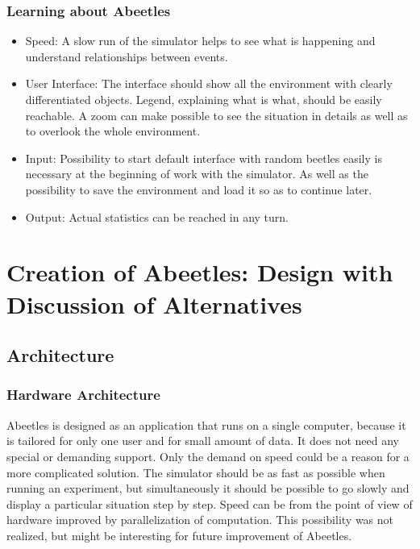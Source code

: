 \documentclass[a4paper,12pt]{report}
\begin{document}
\subsection{Learning about Abeetles}
\begin{itemize}
\item Speed: A slow run of the simulator helps to see what is happening and understand relationships between events.
\item User Interface: The interface should show all the environment with clearly differentiated objects. Legend, explaining what is what, should be easily reachable. A zoom can make possible to see the situation in details as well as to overlook the whole environment.
\item Input: Possibility to start default interface with random beetles easily is necessary at the beginning of work with the simulator. As well as the possibility to save the environment and load it so as to continue later.
\item Output: Actual statistics can be reached in any turn.  
\end{itemize}


\chapter{Creation of Abeetles: Design with Discussion of Alternatives}
\section{Architecture}


\subsection {Hardware Architecture}

Abeetles is designed as an application that runs on a single computer, because it is tailored for only one user and for small amount of data. It does not need any special or demanding support. Only the demand on speed could be a reason for a more complicated solution. The simulator should be as fast as possible when running an experiment, but simultaneously it should be possible to go slowly and display a particular situation step by step. Speed can be from the point of view of hardware improved by parallelization of computation. This possibility was not realized, but might be interesting for future improvement of Abeetles. 
\end{document}
